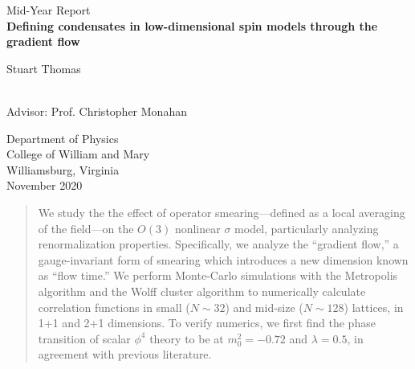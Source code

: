 \documentclass[12pt]{article}
\begin{document}
\setlength{\baselineskip}{24pt}
\begin{titlepage}
\LARGE
\begin{center}
Mid-Year Report\\[2.3cm]

{\bf Defining condensates in low-dimensional spin models through the gradient flow}\\[2.3cm]

\normalsize

Stuart Thomas\\[2.5cm]
\end{center}
\normalsize
\begin{flushright}
\hfill \hrulefill \\
\hfill \hfill Advisor: Prof. Christopher Monahan \\[7.0cm]
\end{flushright}
\begin{center}
Department of Physics\\
College of William and Mary\\
Williamsburg, Virginia\\
November 2020
\end{center}
\end{titlepage}

\setlength{\topmargin}{0.0in}


\setcounter{page}{5}

\begin{abstract}

\indent
We study the the effect of operator smearing---defined as a local averaging of the field---on the $O(3)$ nonlinear $\sigma$ model, particularly analyzing renormalization properties. Specifically, we analyze the ``gradient flow,'' a gauge-invariant form of smearing which introduces a new dimension known as ``flow time.'' We perform Monte-Carlo simulations with the Metropolis algorithm and the Wolff cluster algorithm to numerically calculate correlation functions in small ($N\sim 32$) and mid-size ($N\sim128$) lattices, in 1+1 and 2+1 dimensions. To verify numerics, we first find the phase transition of scalar $\phi^4$ theory to be at $m_0^2=-0.72$ and $\lambda=0.5$, in agreement with previous literature.

\end{abstract}
\end{document}
